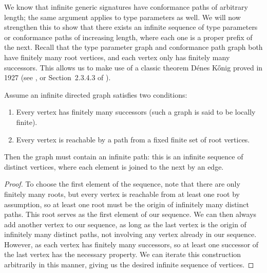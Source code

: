\documentclass[../generics]{subfiles}
\begin{document}
We know that infinite generic signatures have conformance paths of arbitrary length; the same argument applies to type parameters as well. We will now strengthen this to show that there exists an infinite sequence of type parameters or conformance paths of increasing length, where each one is a proper prefix of the next. Recall that the type parameter graph and conformance path graph both have finitely many root vertices, and each vertex only has finitely many successors. This allows us to make use of a classic theorem D\'enes K\H{o}nig proved in 1927 (see \cite{konig}, or Section~2.3.4.3 of \cite{art1}).
\begin{theorem}
Assume an infinite directed graph satisfies two conditions:
\begin{enumerate}
\item Every vertex has finitely many successors (such a graph is said to be locally finite).
\item Every vertex is reachable by a path from a fixed finite set of root vertices.
\end{enumerate}
Then the graph must contain an infinite path: this is an infinite sequence of distinct vertices, where each element is joined to the next by an edge.
\end{theorem}
\begin{proof}
To choose the first element of the sequence, note that there are only finitely many roots, but every vertex is reachable from at least one root by assumption, so at least one root must be the origin of infinitely many distinct paths. This root serves as the first element of our sequence. We can then always add another vertex to our sequence, as long as the last vertex is the origin of infinitely many distinct paths, not involving any vertex already in our sequence. However, as each vertex has finitely many successors, so at least one successor of the last vertex has the necessary property. We can iterate this construction arbitrarily in this manner, giving us the desired infinite sequence of vertices.
\end{proof}

\newcommand{\SelfAToN}{\AssocConf{Self.A}{N}}
\end{document}
